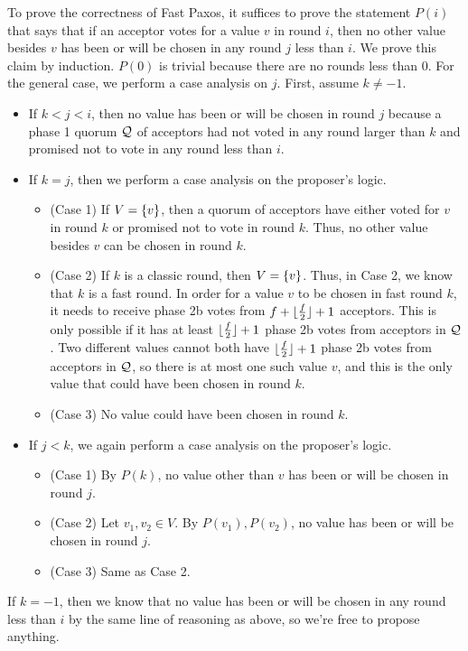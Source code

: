 To prove the correctness of Fast Paxos, it suffices to prove the statement
$P(i)$ that says that if an acceptor votes for a value $v$ in round $i$, then
no other value besides $v$ has been or will be chosen in any round $j$ less
than $i$. We prove this claim by induction. $P(0)$ is trivial because there are
no rounds less than $0$. For the general case, we perform a case analysis on
$j$. First, assume $k \neq -1$.
\begin{itemize}
  \item
    If $k < j < i$, then no value has been or will be chosen in round $j$
    because a phase 1 quorum $\mathcal{Q}$ of acceptors had not voted in any round
    larger than $k$ and promised not to vote in any round less than $i$.

  \item
    If $k = j$, then we perform a case analysis on the proposer's logic.
    \begin{itemize}
      \item
        (Case 1) If $V = \{v\}$, then a quorum of acceptors have either voted
        for $v$ in round $k$ or promised not to vote in round $k$. Thus, no
        other value besides $v$ can be chosen in round $k$.
      \item
        (Case 2) If $k$ is a classic round, then $V = \{v\}$. Thus, in Case
        2, we know that $k$ is a fast round. In order for a value $v$ to be
        chosen in fast round $k$, it needs to receive phase 2b votes from $f +
        \lfloor\frac{f}{2}\rfloor + 1$ acceptors. This is only possible if it has at
        least $\lfloor\frac{f}{2}\rfloor + 1$ phase 2b votes from acceptors in $\mathcal{Q}$.
        Two different values cannot both have $\lfloor\frac{f}{2}\rfloor + 1$ phase 2b
        votes from acceptors in $\mathcal{Q}$, so there is at most one such value
        $v$, and this is the only value that could have been chosen in round
        $k$.
      \item
        (Case 3) No value could have been chosen in round $k$.
    \end{itemize}

  \item
    If $j < k$, we again perform a case analysis on the proposer's logic.
    \begin{itemize}
      \item
        (Case 1) By $P(k)$, no value other than $v$ has been or will be chosen
        in round $j$.
      \item
        (Case 2) Let $v_1, v_2 \in V$. By $P(v_1), P(v_2)$, no value has been
        or will be chosen in round $j$.
      \item
        (Case 3) Same as Case 2.
    \end{itemize}
\end{itemize}
If $k = -1$, then we know that no value has been or will be chosen in any round
less than $i$ by the same line of reasoning as above, so we're free to propose
anything.

